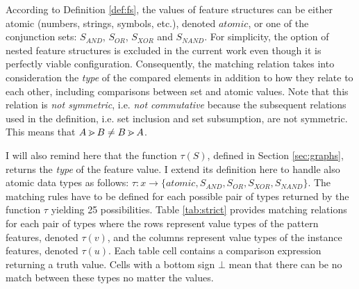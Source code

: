     According to Definition \ref{def:fs}, the values of feature structures can be either atomic (numbers, strings, symbols, etc.), denoted $atomic$, or one of the conjunction sets: $S_{AND}$, $S_{OR}$, $S_{XOR}$ and $S_{NAND}$. For simplicity, the option of nested feature structures is excluded in the current work even though it is perfectly viable configuration. Consequently, the matching relation takes into consideration the \textit{type} of the compared elements in addition to how they relate to each other, including comparisons between set and atomic values. Note that this relation is \textit{not symmetric}, i.e. \textit{not commutative} because the subsequent relations used in the definition, i.e. set inclusion and set subsumption, are not symmetric. This means that $A \operatorname{\gtrdot} B \neq B \operatorname{\gtrdot} A $. 

    I will also remind here that the function $\tau(S)$, defined in Section \ref{sec:graphs}, returns the \textit{type} of the feature value. I extend its definition here to handle also atomic data types as follows: $\tau:x \rightarrow \{atomic, S_{AND}, S_{OR}, S_{XOR}, S_{NAND} \}$. The matching rules have to be defined for each possible pair of types returned by the function $\tau$ yielding 25 possibilities. Table \ref{tab:strict} provides matching relations for each pair of types where the rows represent value types of the pattern features, denoted $\tau(v)$, and the columns represent value types of the instance features, denoted $\tau(u)$. Each table cell contains a comparison expression returning a truth value. Cells with a bottom sign $\bot$ mean that there can be no match between these types no matter the values. 

